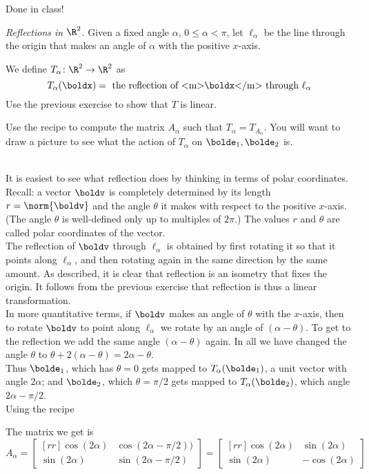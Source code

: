 \begin{solution}
Done in class! 
\end{solution}
\begin{samepage}
\ii
\label{Ex:refl} {\em Reflections in $\R^2$}. Given a fixed angle $\alpha$, $0\leq \alpha<\pi $, let $\ell_{\alpha}$ be the line through the origin that makes an angle of $\alpha$ with the positive $x$-axis. 

We define $T_{\alpha}\colon\R^2\rightarrow \R^2$ as 
\[
T_\alpha(\boldx)=\text{ the reflection of <m>\boldx</m> through $\ell_\alpha$}
\]
\bb
\ii Use the previous exercise to show that $T$ is linear. 

\ii Use the recipe to compute the matrix $A_{\alpha}$ such that $T_\alpha=T_{A_\alpha}$.  You will want to draw a picture to see what the action of $T_\alpha$ on $\bolde_1, \bolde_2$ is. 
\ee
\end{samepage}
\begin{solution}
\ \\
It is easiest to see what reflection does by thinking in terms of polar coordinates. Recall: a vector $\boldv$ is completely determined by its length $r=\norm{\boldv}$ and the angle $\theta$ it makes with respect to the positive $x$-axis. (The angle $\theta$ is well-defined only up to multiples of $2\pi$.) The values $r$ and $\theta$ are called polar coordinates of the vector. 
\\
The reflection of $\boldv$ through $\ell_{\alpha}$ is obtained by first rotating it so that it points along $\ell_{\alpha}$, and then rotating again in the same direction by the same amount. As described, it is clear that reflection is an isometry that fixes the origin. It follows from the previous exercise that reflection is thus a linear transformation. 
\\
In more quantitative terms, 
if $\boldv$ makes an angle of $\theta$ with the $x$-axis, then to rotate $\boldv$ to point along $\ell_{\alpha}$ we rotate by an angle of $(\alpha-\theta)$. To get to the reflection we add the same angle $(\alpha-\theta)$ again. In all we have changed the angle $\theta$ to $\theta+2(\alpha-\theta)=2\alpha-\theta$. 
\\
Thus $\bolde_1$, which has $\theta=0$ gets mapped to $T_{\alpha}(\bolde_1)$, a unit vector with angle $2\alpha$; and $\bolde_2$, which $\theta=\pi/2$ gets mapped to $T_{\alpha}(\bolde_2)$, which angle $2\alpha-\pi/2$.
\\ 
Using the recipe 

The matrix we get is 
\[
A_\alpha=\begin{bmatrix}[rr]
\cos(2\alpha)&\cos(2\alpha-\pi/2))\\
\sin(2\alpha)&\sin(2\alpha-\pi/2)
\end{bmatrix}
=
\begin{bmatrix}[rr]
\cos(2\alpha)&\sin(2\alpha)\\
\sin(2\alpha)&-\cos(2\alpha)
\end{bmatrix}
\]
\end{solution}


